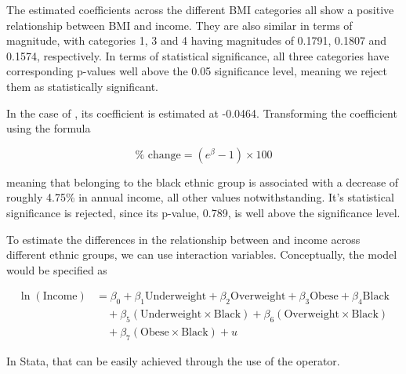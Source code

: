 \newpage


The estimated coefficients across the different BMI categories all show a positive relationship between BMI and income. They are also similar in terms of magnitude, with categories 1, 3 and 4 having magnitudes of 0.1791, 0.1807 and 0.1574, respectively. In terms of statistical significance, all three categories have corresponding p-values well above the 0.05 significance level, meaning we reject them as statistically significant.

In the case of , its coefficient is estimated at -0.0464. Transforming the coefficient using the formula

\begin{equation}
    \% \text{ change} = (e^{\beta} - 1) \times 100
\end{equation}

meaning that belonging to the black ethnic group is associated with a decrease of roughly 4.75\% in annual income, all other values notwithstanding. It's statistical significance is rejected, since its p-value, 0.789, is well above the significance level.


To estimate the differences in the relationship between  and income across different ethnic groups, we can use interaction variables. Conceptually, the model would be specified as

\begin{equation}
    \begin{aligned}
        \ln(\text{Income}) & = \beta_0 + \beta_1 \text{Underweight} + \beta_2 \text{Overweight} + \beta_3 \text{Obese} + \beta_4 \text{Black} \\
                           & \quad + \beta_5 (\text{Underweight} \times \text{Black}) + \beta_6 (\text{Overweight} \times \text{Black})       \\
                           & \quad  + \beta_7 (\text{Obese} \times \text{Black}) + u
    \end{aligned}
\end{equation}

In Stata, that can be easily achieved through the use of the \icode{##} operator.

